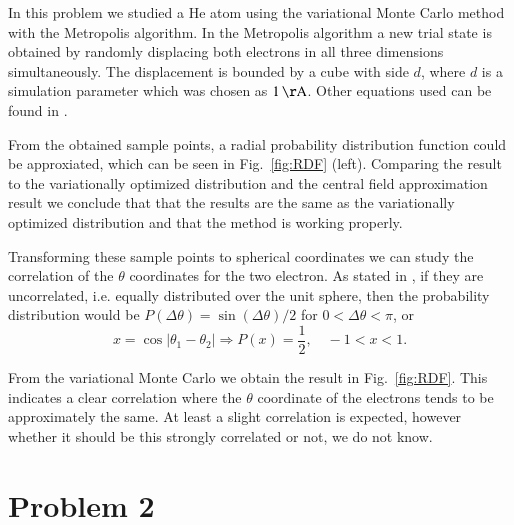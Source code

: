 In this problem we studied a He atom using the variational Monte Carlo method with the Metropolis algorithm. In the Metropolis algorithm a new trial state is obtained by randomly displacing both electrons in all three dimensions simultaneously. The displacement is bounded by a cube with side $d$, where $d$ is a simulation parameter which was chosen as $\unit[1]{\AA}$. Other equations used can be found in \cite{probdesc}.

From the obtained sample points, a radial probability distribution function could be approxiated, which can be seen in Fig.~\ref{fig:RDF} (left). Comparing the result to the variationally optimized distribution and the central field approximation result we conclude that that the results are the same as the variationally optimized distribution and that the method is working properly.

Transforming these sample points to spherical coordinates we can study the correlation of the $\theta$ coordinates for the two electron. As stated in \cite{probdesc}, if they are uncorrelated, i.e. equally distributed over the unit sphere, then the probability distribution would be $P(\Delta \theta) = \sin (\Delta \theta) / 2$ for $0 < \Delta\theta < \pi$, or
\begin{equation}
	x = \cos \left|\theta_1 - \theta_2\right| \Rightarrow P(x) = \frac{1}{2},\quad -1 < x < 1.
\end{equation}

From the variational Monte Carlo we obtain the result in Fig.~\ref{fig:RDF}. This indicates a clear correlation where the $\theta$ coordinate of the electrons tends to be approximately the same. At least a slight correlation is expected, however whether it should be this strongly correlated or not, we do not know.

\section*{Problem 2}

